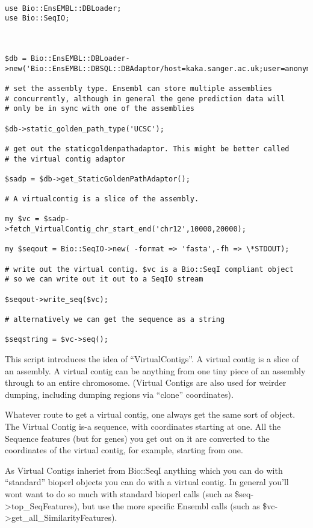 \documentclass[11pt,a4paper]{article}
\begin{document}
\begin{verbatim}

use Bio::EnsEMBL::DBLoader;
use Bio::SeqIO;



$db = Bio::EnsEMBL::DBLoader->new('Bio::EnsEMBL::DBSQL::DBAdaptor/host=kaka.sanger.ac.uk;user=anonymous;dbname=current');

# set the assembly type. Ensembl can store multiple assemblies
# concurrently, although in general the gene prediction data will
# only be in sync with one of the assemblies

$db->static_golden_path_type('UCSC');

# get out the staticgoldenpathadaptor. This might be better called
# the virtual contig adaptor

$sadp = $db->get_StaticGoldenPathAdaptor();

# A virtualcontig is a slice of the assembly.

my $vc = $sadp->fetch_VirtualContig_chr_start_end('chr12',10000,20000);

my $seqout = Bio::SeqIO->new( -format => 'fasta',-fh => \*STDOUT);

# write out the virtual contig. $vc is a Bio::SeqI compliant object
# so we can write out it out to a SeqIO stream

$seqout->write_seq($vc);

# alternatively we can get the sequence as a string

$seqstring = $vc->seq();

\end{verbatim}

This script introduces the idea of ``VirtualContigs''. A virtual contig is a
slice of an assembly. A virtual contig can be anything from one tiny piece
of an assembly through to an entire chromosome. (Virtual Contigs are also used
for weirder dumping, including dumping regions via ``clone'' coordinates).

Whatever route to get a virtual contig, one always get the same sort
of object.  The Virtual Contig is-a sequence, with coordinates
starting at one. All the Sequence features (but for genes) you get out
on it are converted to the coordinates of the virtual contig, for example,
starting from one. 

As Virtual Contigs inheriet from Bio::SeqI anything which you can do
with ``standard'' bioperl objects you can do with a virtual contig. In
general you'll wont want to do so much with standard bioperl calls
(such as \$seq->top\_SeqFeatures), but use the more specific Ensembl
calls (such as \$vc->get\_all\_SimilarityFeatures).
\end{document}
